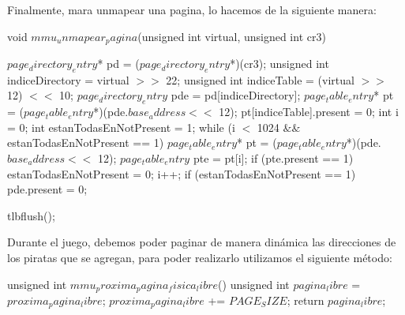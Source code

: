 Finalmente, mara unmapear una pagina, lo hacemos de la siguiente manera:
\begin{algorithmic}
     
\State \tab void $mmu_unmapear_pagina$(unsigned int virtual, unsigned int cr3) {
  \State \tab \tab $page_directory_entry$* pd = ($page_directory_entry$*)(cr3);
  \State \tab \tab unsigned int indiceDirectory = virtual $>>$ 22;
  \State \tab \tab unsigned int indiceTable = (virtual $>>$ 12) $<<$ 10;
  \State \tab \tab $page_directory_entry$ pde = pd[indiceDirectory];
  \State \tab \tab $page_table_entry$* pt = ($page_table_entry$*)(pde.$base_address <<$ 12);
  \State \tab \tab pt[indiceTable].present = 0;
  \State \tab \tab int i = 0;
  \State \tab \tab int estanTodasEnNotPresent = 1;
  \State \tab \tab while (i $<$ 1024 $\&\&$ estanTodasEnNotPresent == 1) {
    \State \tab \tab \tab $page_table_entry$* pt = ($page_table_entry$*)(pde.$base_address <<$ 12);
    \State \tab \tab \tab $page_table_entry$ pte = pt[i];
    \State \tab \tab \tab if (pte.present == 1) {
      \State \tab \tab \tab \tab estanTodasEnNotPresent = 0;
    \State \tab \tab \tab }
    \State \tab \tab \tab i++;
  \State \tab \tab }
  \State \tab \tab if (estanTodasEnNotPresent == 1) {
    \State \tab \tab \tab pde.present = 0;
  \State \tab \tab  }

  \State \tab \tab tlbflush();
\State \tab  }
\end{algorithmic}

Durante el juego, debemos poder paginar de manera din\'amica las direcciones de los piratas que se agregan, para poder realizarlo utilizamos el siguiente m\'etodo:
\begin{algorithmic}
    \State \tab unsigned int $mmu_proxima_pagina_fisica_libre$() {
  \State \tab \tab unsigned int $pagina_libre$ = $proxima_pagina_libre$;
  \State \tab \tab $proxima_pagina_libre$ += $PAGE_SIZE$;
  \State \tab \tab return $pagina_libre$;
\State \tab }
\end{algorithmic}
















